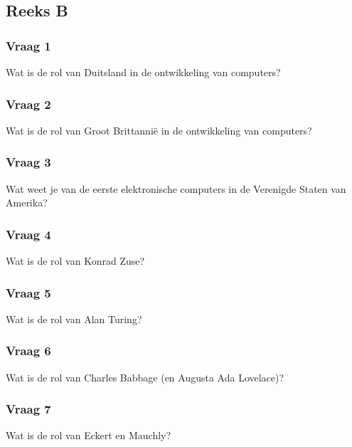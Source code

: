 \documentclass[../main.tex]{subfiles}
\begin{document}
\subsection{Reeks B}
\subsubsection{Vraag 1}
\begin{question}
Wat is de rol van Duitsland in de ontwikkeling van computers?
\end{question}

\subsubsection{Vraag 2}
\begin{question}
Wat is de rol van Groot Brittannië in de ontwikkeling van computers?
\end{question}

\subsubsection{Vraag 3}
\begin{question}
Wat weet je van de eerste elektronische computers in de Verenigde Staten van Amerika?
\end{question}

\subsubsection{Vraag 4}
\begin{question}
Wat is de rol van Konrad Zuse?
\end{question}

\subsubsection{Vraag 5}
\begin{question}
Wat is de rol van Alan Turing?
\end{question}

\subsubsection{Vraag 6}
\begin{question}
Wat is de rol van Charles Babbage (en Augusta Ada Lovelace)?
\end{question}

\subsubsection{Vraag 7}
\begin{question}
Wat is de rol van Eckert en Mauchly?
\end{question}
\end{document}
